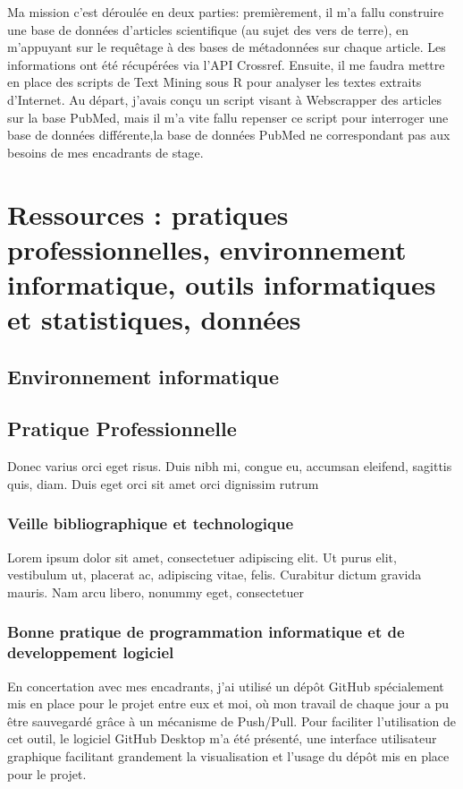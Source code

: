 \documentclass{book}
\begin{document}
\noindent
Ma mission c'est déroulée en deux parties: premièrement, il m'a fallu
construire une base de données d'articles scientifique (au sujet des vers de
terre), en m'appuyant sur le requêtage à des bases de métadonnées sur chaque
article. Les informations ont été récupérées via l'API Crossref.
Ensuite, il me faudra mettre en place des scripts de Text Mining sous R pour
analyser les textes extraits d'Internet.
Au départ, j'avais conçu un script visant à Webscrapper des articles sur la
base PubMed, mais il m'a vite fallu repenser ce script pour interroger une base
de données différente,la base de données PubMed ne correspondant pas aux
besoins de mes encadrants de stage.

\lipsum[1-4]

\thispagestyle{fancy}

\chapter[Ressources]{\label{Second Chapitre}Ressources : pratiques
  professionnelles, environnement informatique, outils informatiques et
  statistiques, données}
\section{Environnement informatique}
\noindent

\section{Pratique Professionnelle}
\noindent
Donec varius orci eget risus. Duis nibh mi, congue eu, accumsan eleifend,
sagittis quis, diam. Duis eget
orci sit amet orci dignissim rutrum

\subsection{Veille bibliographique et technologique}
\noindent
Lorem ipsum dolor sit amet, consectetuer adipiscing elit. Ut purus elit,
vestibulum ut, placerat ac,
adipiscing vitae, felis. Curabitur dictum gravida mauris. Nam arcu libero,
nonummy eget, consectetuer

\subsection[Bonnes pratiques]{Bonne pratique de programmation informatique et
    de developpement logiciel}
\noindent
En concertation avec mes encadrants, j'ai utilisé un dépôt GitHub spécialement
mis en place pour le projet entre eux et moi, où mon travail de chaque jour a
pu être sauvegardé grâce à un mécanisme de Push/Pull. Pour faciliter
l'utilisation de cet outil, le logiciel GitHub Desktop m'a été présenté, une
interface utilisateur graphique facilitant grandement la visualisation et
l'usage du dépôt mis en place pour le projet.
\end{document}

